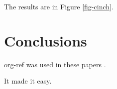 \documentclass[11pt]{article}
\begin{document}
The results are in Figure \ref{fig-cinch}.

\section{Conclusions}
\label{sec:orgheadline4}
org-ref was used in these papers \cite{xu-2015-tunin-oxide,xu-2015-relat,xu-2015-linear-respon,xu-2015-accur-u,xu-2014-relat,xu-2014-probin-cover,miller-2014-simul-temper,mehta-2014-ident-poten,kitchin-2015-examp,kitchin-2015-data-surfac-scien,hallenbeck-2013-effec-o2,curnan-2014-effec-concen,boes-2015-estim-bulk-si,boes-2015-estim-bulk}.

It made it easy.



\end{document}
